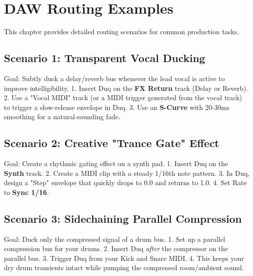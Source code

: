 \chapter{DAW Routing Examples}
\label{ch:daw_routing_examples}

This chapter provides detailed routing scenarios for common production tasks.

\section{Scenario 1: Transparent Vocal Ducking}
Goal: Subtly duck a delay/reverb bus whenever the lead vocal is active to improve intelligibility.
1. Insert Duq on the \textbf{FX Return} track (Delay or Reverb).
2. Use a "Vocal MIDI" track (or a MIDI trigger generated from the vocal track) to trigger a slow-release envelope in Duq.
3. Use an \textbf{S-Curve} with 20-30ms smoothing for a natural-sounding fade.

\section{Scenario 2: Creative "Trance Gate" Effect}
Goal: Create a rhythmic gating effect on a synth pad.
1. Insert Duq on the \textbf{Synth} track.
2. Create a MIDI clip with a steady 1/16th note pattern.
3. In Duq, design a "Step" envelope that quickly drops to 0.0 and returns to 1.0.
4. Set Rate to \textbf{Sync 1/16}.

\section{Scenario 3: Sidechaining Parallel Compression}
Goal: Duck only the compressed signal of a drum bus.
1. Set up a parallel compression bus for your drums.
2. Insert Duq \textit{after} the compressor on the parallel bus.
3. Trigger Duq from your Kick and Snare MIDI.
4. This keeps your dry drum transients intact while pumping the compressed room/ambient sound.
